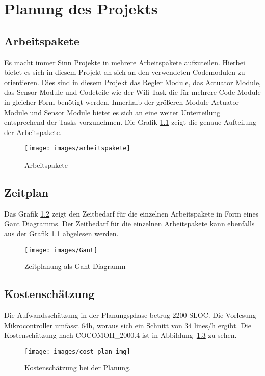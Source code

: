 \chapter{Planung des Projekts}
\label{cha:Planung}

\section{Arbeitspakete}

Es macht immer Sinn Projekte in mehrere Arbeitspakete aufzuteilen. Hierbei bietet es sich in diesem Projekt an sich an den verwendeten Codemodulen zu orientieren. Dies sind in diesem Projekt das Regler Module, das Actuator Module, das Sensor Module und Codeteile wie der Wifi-Task die für mehrere Code Module in gleicher Form benötigt werden. Innerhalb der größeren Module Actuator Module und Sensor Module bietet es sich an eine weiter Unterteilung entsprechend der Tasks vorzunehmen. Die Grafik \ref{fig:arbeitspakete} zeigt die genaue Aufteilung der Arbeitspakete.

\begin{figure}[hbt]
	\centering
	\texttt{[image: images/arbeitspakete]}
	\caption[Arbeitspakete]{Arbeitspakete}
	\label{fig:arbeitspakete}
\end{figure}

\section{Zeitplan}
Das Grafik \ref{fig:time_plan} zeigt den Zeitbedarf für die einzelnen Arbeitspakete in Form eines Gant Diagramms. Der Zeitbedarf für die einzelnen Arbeitspakete kann ebenfalls aus der Grafik \ref{fig:arbeitspakete} abgelesen werden.

\begin{figure}[hbt]
	\centering
	\texttt{[image: images/Gant]}
	\caption[Zeitplanung als Gant Diagramm]{Zeitplanung als Gant Diagramm}
	\label{fig:time_plan}
\end{figure}


\section{Kostenschätzung}
\label{cha:Planung_cost}
Die Aufwandsschätzung in der Planungsphase betrug 2200 SLOC. Die Vorlesung Mikrocontroller umfasst 64h, woraus sich ein Schnitt von 34 lines/h ergibt. Die Kostenschätzung nach COCOMOII\_2000.4 ist in Abbildung~\ref{fig:cost_plan} zu sehen.

\begin{figure}[hbt]
	\centering
	\texttt{[image: images/cost\_plan\_img]}
	\caption[Kostenschätzung Planung]{Kostenschätzung bei der Planung.}
	\label{fig:cost_plan}
\end{figure}